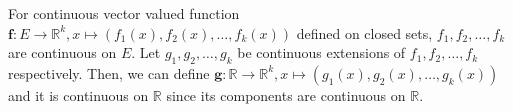 \documentclass{scrartcl}
\begin{document}
For continuous vector valued function \(\mathbf{f} : E \to \mathbb{R}^k, x \mapsto (f_1(x), f_2(x), \dots, f_k(x))\) defined on closed sets, \(f_1, f_2, \dots, f_k\) are continuous on \(E\).
Let \(g_1, g_2, \dots, g_k\) be continuous extensions of \(f_1, f_2, \dots, f_k\) respectively.
Then, we can define \(\mathbf{g} : \mathbb{R} \to \mathbb{R}^k, x \mapsto (g_1(x), g_2(x), \dots, g_k(x))\) and it is continuous on \(\mathbb{R}\) since its components are continuous on \(\mathbb{R}\).
\end{document}
